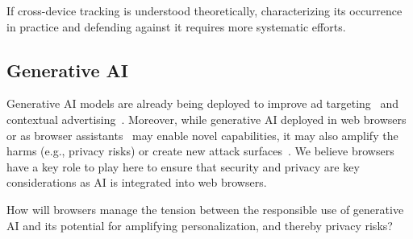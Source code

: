 \begin{opbox}
If cross-device tracking is understood theoretically, characterizing its occurrence in practice and defending against it requires more systematic efforts.
\end{opbox}


\subsection{Generative AI}
Generative AI models are already being deployed to improve ad targeting~\cite{adv-week-genai-targeting} and contextual advertising~\cite{cognitiv2024cookieless}.
%
Moreover, while generative AI deployed in web browsers~\cite{google2024chromeai} or as browser assistants~\cite{vekaria2025big} may enable novel capabilities, it may also amplify the harms (e.g., privacy risks) or create new attack surfaces~\cite{mcp-security}. 
%
We believe browsers have a key role to play here to ensure that security and privacy are key considerations as AI is integrated into web browsers.


\begin{opbox}
How will browsers manage the tension between the responsible use of generative AI and its potential for amplifying personalization, and thereby privacy risks?
\end{opbox}



